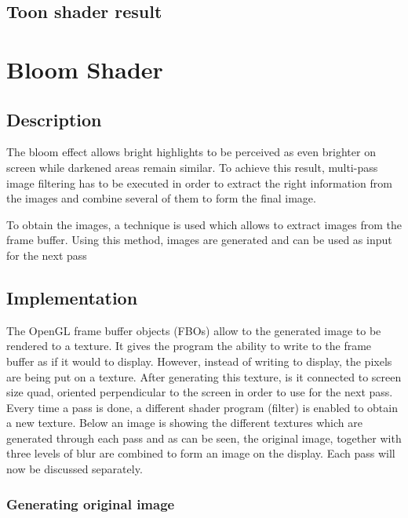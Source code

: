 \documentclass[a4paper,12pt]{article}
\begin{document}
\subsection{Toon shader result}
\label{sec:ToonShaderResult}


\section{Bloom Shader}
\label{sec:BloomShader}

\subsection{Description}
\label{sec:DescriptionBloomShader}

The bloom effect allows bright highlights to be perceived as even brighter on screen while darkened areas remain similar. To achieve this result, multi-pass image filtering has to be executed in order to extract the right information from the images and combine several of them to form the final image.

To obtain the images, a technique is used which allows to extract images from the frame buffer. Using this method, images are generated and can be used as input for the next pass


\subsection{Implementation}
\label{sec:ImplementationBloomShader}

The OpenGL frame buffer objects (FBOs) allow to the generated image to be rendered to a texture. It gives the program the ability to write to the frame buffer as if it would to display. However, instead of writing to display, the pixels are being put on a texture. After generating this texture, is it connected to screen size quad, oriented perpendicular to the screen in order to use for the next pass. Every time a pass is done, a different shader program (filter) is enabled to obtain a new texture. Below an image is showing the different textures which are generated through each pass and as can be seen, the original image, together with three levels of blur are combined to form an image on the display. Each pass will now be discussed separately.

\subsubsection{Generating original image}
\label{sec:GeneratingOriginalImage}
\end{document}
